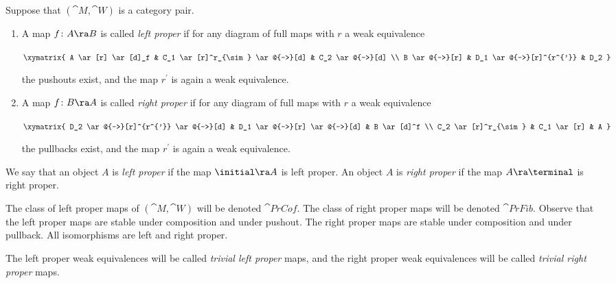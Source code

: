 \begin{defn}
\label{defn:propercofibration}
Suppose that $({\cat M}, {\cat W})$ is a category pair.
\begin{enumerate}
\item
A map $f \colon A \ra B$ is called {\it left proper} if for any diagram of full maps with $r$ a weak equivalence
\begin{center}
$\xymatrix {
    A \ar[r] \ar[d]_f & C_1 \ar[r]^r_{\sim} \ar@{-->}[d] & C_2 \ar@{-->}[d] \\
    B \ar@{-->}[r] & D_1 \ar@{-->}[r]^{r^{'}} & D_2
  }$
\end{center}
the pushouts exist, and the map $r^{'}$ is again a weak equivalence. 
\item
A map $f \colon B \ra A$ is called {\it right proper} if for any diagram of full maps with $r$ a weak equivalence
\begin{center}
$\xymatrix {
    D_2 \ar@{-->}[r]^{r^{'}} \ar@{-->}[d] & D_1 \ar@{-->}[r] \ar@{-->}[d] & B \ar[d]^f \\
    C_2 \ar[r]^r_{\sim} & C_1 \ar[r] & A
  }$
\end{center}
the pullbacks exist, and the map $r^{'}$ is again a weak equivalence. 
\end{enumerate}
\end{defn}

We say that an object $A$ is {\it left proper} if the map $\initial \ra A$ is left proper. An object $A$ is {\it right proper} if the map $A \ra \terminal$ is right proper.

The class of left proper maps of $({\cat M}, {\cat W})$ will be denoted ${\cat PrCof}$. The class of right proper maps will be denoted ${\cat PrFib}$. Observe that the left proper maps are stable under composition and under pushout. The right proper maps are stable under composition and under pullback. All isomorphisms are left and right proper.

The left proper weak equivalences will be called {\it trivial left proper} maps, and the right proper weak equivalences will be called {\it trivial right proper} maps.

